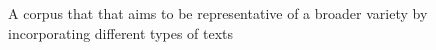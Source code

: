 A corpus that that aims to be representative of a broader variety by incorporating different types of texts
